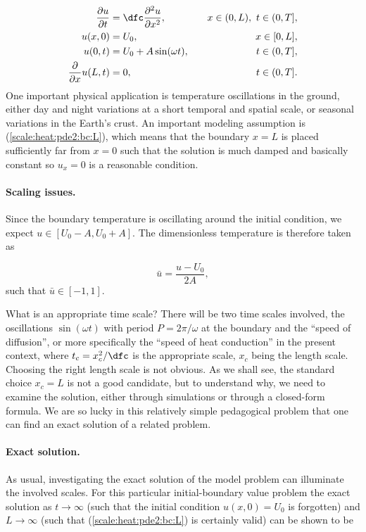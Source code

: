 \documentclass[graybox,envcountchap,sectrefs,final]{svmonodo}
\begin{document}
\begin{align}
\frac{\partial u}{\partial t} &=
\dfc \frac{\partial^2 u}{\partial x^2},
\quad &  x\in (0,L),\ t\in (0, T],
\label{scale:heat:pde2}\\ 
u(x,0) &= U_0,
\quad & x\in [0,L],
\label{scale:heat:pde2:ic:u}\\ 
u(0, t) & = U_0 + A\sin(\omega t),
\quad  & t\in (0, T],
\label{scale:heat:pde2:bc:0}\\ 
\frac{\partial}{\partial x} u(L, t) & = 0,
\quad & t\in (0, T].
\label{scale:heat:pde2:bc:L}
\end{align}
One important physical application is temperature oscillations in the
ground, either day and night variations
at a short temporal and spatial scale, or seasonal variations in the
Earth's crust.
An important modeling assumption is (\ref{scale:heat:pde2:bc:L}),
which means that the boundary $x=L$ is placed sufficiently far from $x=0$
such that the solution is much damped and basically constant so
$u_x=0$ is a reasonable condition.

\paragraph{Scaling issues.}
Since the boundary temperature is oscillating around the initial
condition, we expect $u\in [U_0-A,U_0+A]$.
The dimensionless temperature is therefore taken as

\[ \bar u = \frac{u-U_0}{2A},\]
such that $\bar u\in [-1,1]$.

What is an appropriate time scale? There will be two time scales involved,
the oscillations $\sin(\omega t)$ with period $P=2\pi/\omega$ at
the boundary and the ``speed of diffusion'', or more specifically
the ``speed of heat conduction'' in the present context,
where $t_c=x_c^2/\dfc$ is the appropriate scale, $x_c$ being
the length scale. Choosing the right length scale is not obvious. As
we shall see, the standard choice $x_c=L$ is not a good candidate, but
to understand why, we need to examine the solution, either through
simulations or through a closed-form formula. We are so lucky in this
relatively simple pedagogical problem that one can find an exact solution
of a related problem.

\paragraph{Exact solution.}
As usual, investigating the exact solution of the model problem can
illuminate the involved scales. For this particular initial-boundary
value problem the exact solution as $t\rightarrow\infty$
(such that
the initial condition $u(x,0)=U_0$ is forgotten)
and $L\rightarrow\infty$ (such that (\ref{scale:heat:pde2:bc:L})
is certainly valid) can be shown to be
\end{document}
